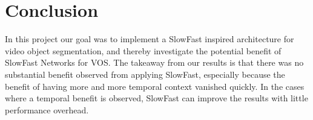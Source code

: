 \section{Conclusion}
In this project our goal was to implement a SlowFast inspired architecture for video object segmentation, and thereby investigate the potential benefit of SlowFast Networks for VOS. The takeaway from our results is that there was no substantial benefit observed from applying SlowFast, especially because the benefit of having more and more temporal context vanished quickly. In the cases where a temporal benefit is observed, SlowFast can improve the results with little performance overhead.